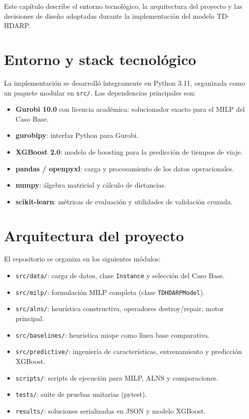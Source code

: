 Este capítulo describe el entorno tecnológico, la arquitectura del proyecto y las decisiones de diseño adoptadas durante la implementación del modelo TD-HDARP.

\section{Entorno y stack tecnológico}

La implementación se desarrolló íntegramente en Python 3.11, organizada como un paquete modular en \texttt{src/}. Las dependencias principales son:

\begin{itemize}
    \item \textbf{Gurobi 10.0} con licencia académica: solucionador exacto para el MILP del Caso Base.
    \item \textbf{gurobipy}: interfaz Python para Gurobi.
    \item \textbf{XGBoost 2.0}: modelo de boosting para la predicción de tiempos de viaje.
    \item \textbf{pandas / openpyxl}: carga y procesamiento de los datos operacionales.
    \item \textbf{numpy}: álgebra matricial y cálculo de distancias.
    \item \textbf{scikit-learn}: métricas de evaluación y utilidades de validación cruzada.
\end{itemize}

\section{Arquitectura del proyecto}

El repositorio se organiza en los siguientes módulos:

\begin{itemize}
    \item \texttt{src/data/}: carga de datos, clase \texttt{Instance} y selección del Caso Base.
    \item \texttt{src/milp/}: formulación MILP completa (clase \texttt{TDHDARPModel}).
    \item \texttt{src/alns/}: heurística constructiva, operadores destroy/repair, motor principal.
    \item \texttt{src/baselines/}: heurística miope como línea base comparativa.
    \item \texttt{src/predictive/}: ingeniería de características, entrenamiento y predicción XGBoost.
    \item \texttt{scripts/}: scripts de ejecución para MILP, ALNS y comparaciones.
    \item \texttt{tests/}: suite de pruebas unitarias (pytest).
    \item \texttt{results/}: soluciones serializadas en JSON y modelo XGBoost.
\end{itemize}

